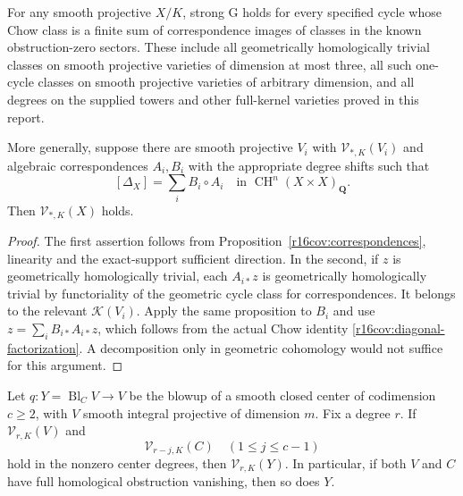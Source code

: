 \begin{corollary}
\label{r16cov:generated-sector}
For any smooth projective $X/K$, strong G holds for every specified
cycle whose Chow class is a finite sum of correspondence images
of classes in the known obstruction-zero sectors.  These include
all geometrically homologically trivial classes on smooth projective
varieties of dimension at most three, all such one-cycle classes
on smooth projective varieties of arbitrary dimension, and all
degrees on the supplied towers and other full-kernel varieties
proved in this report.

More generally, suppose there are smooth projective $V_i$ with
$\mathcal V_{*,K}(V_i)$ and algebraic correspondences $A_i,B_i$
with the appropriate degree shifts such that
\[
                 [\Delta_X]=\sum_i B_i\circ A_i
                       \quad\text{in }\operatorname{CH}^{n}(X\times X)_{\mathbf Q}.
 \tag{CV16.4}\label{r16cov:diagonal-factorization}
\]
Then $\mathcal V_{*,K}(X)$ holds.
\end{corollary}

\begin{proof}
The first assertion follows from Proposition~\ref{r16cov:correspondences},
linearity and the exact-support sufficient direction.  In the second,
if $z$ is geometrically homologically trivial, each $A_{i*}z$ is
geometrically homologically trivial by functoriality of the geometric
cycle class for correspondences.  It belongs to the relevant
$\mathcal K(V_i)$.  Apply the same proposition to $B_i$ and use
$z=\sum_i B_{i*}A_{i*}z$, which follows from the actual Chow identity
\eqref{r16cov:diagonal-factorization}.  A decomposition only in
geometric cohomology would not suffice for this argument.
\end{proof}

\begin{proposition}
\label{r16cov:blowup-ascent}
Let $q:Y=\operatorname{Bl}_C V\to V$ be the blowup of a smooth
closed center of codimension $c\geq2$, with $V$ smooth integral
projective of dimension $m$.  Fix a degree $r$.
If $\mathcal V_{r,K}(V)$ and
\[
                    \mathcal V_{r-j,K}(C)
                              \quad(1\leq j\leq c-1)
 \tag{CV16.5}\label{r16cov:center-hypotheses}
\]
hold in the nonzero center degrees, then $\mathcal V_{r,K}(Y)$.
In particular, if both $V$ and $C$ have full homological obstruction
vanishing, then so does $Y$.
\end{proposition}

